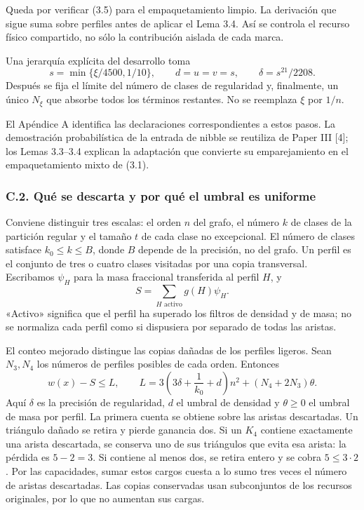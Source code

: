 \documentclass[spanish,11pt,a4paper]{article}
\begin{document}
Queda por verificar (3.5) para el empaquetamiento limpio. La derivación que sigue suma sobre perfiles antes de aplicar el Lema 3.4. Así se controla el recurso físico compartido, no sólo la contribución aislada de cada marca.

Una jerarquía explícita del desarrollo toma \[
s=\min\{\xi/4500,1/10\},\qquad
d=u=v=s,\qquad \delta=s^{21}/2208.
\] Después se fija el límite del número de clases de regularidad y, finalmente, un único \(N_\xi\) que absorbe todos los términos restantes. No se reemplaza \(\xi\) por \(1/n\).

El Apéndice A identifica las declaraciones correspondientes a estos pasos. La demostración probabilística de la entrada de nibble se reutiliza de Paper III {[}4{]}; los Lemas 3.3--3.4 explican la adaptación que convierte su emparejamiento en el empaquetamiento mixto de (3.1).

\subsubsection{C.2. Qué se descarta y por qué el umbral es uniforme}\label{c.2.-que-se-descarta-y-por-que-el-umbral-es-uniforme}

Conviene distinguir tres escalas: el orden \(n\) del grafo, el número \(k\) de clases de la partición regular y el tamaño \(t\) de cada clase no excepcional. El número de clases satisface \(k_0\le k\le B\), donde \(B\) depende de la precisión, no del grafo. Un perfil es el conjunto de tres o cuatro clases visitadas por una copia transversal. Escribamos \(\psi_H\) para la masa fraccional transferida al perfil \(H\), y \[
S=\sum_{H\text{ activo}}g(H)\psi_H.
\] «Activo» significa que el perfil ha superado los filtros de densidad y de masa; no se normaliza cada perfil como si dispusiera por separado de todas las aristas.

El conteo mejorado distingue las copias dañadas de los perfiles ligeros. Sean \(N_3,N_4\) los números de perfiles posibles de cada orden. Entonces \[
w(x)-S\le L,\qquad
L=3\left(3\delta+\frac1{k_0}+d\right)n^2
  +(N_4+2N_3)\theta.
\tag{3.10}
\] Aquí \(\delta\) es la precisión de regularidad, \(d\) el umbral de densidad y \(\theta\ge0\) el umbral de masa por perfil. La primera cuenta se obtiene sobre las aristas descartadas. Un triángulo dañado se retira y pierde ganancia dos. Si un \(K_4\) contiene exactamente una arista descartada, se conserva uno de sus triángulos que evita esa arista: la pérdida es \(5-2=3\). Si contiene al menos dos, se retira entero y se cobra \(5\le3\cdot2\). Por las capacidades, sumar estos cargos cuesta a lo sumo tres veces el número de aristas descartadas. Las copias conservadas usan subconjuntos de los recursos originales, por lo que no aumentan sus cargas.
\end{document}
